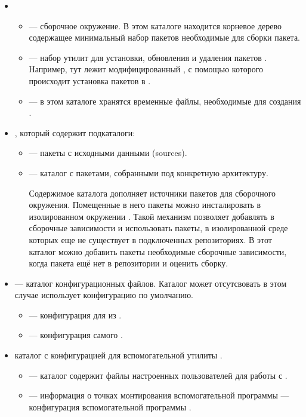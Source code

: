 \begin{itemize}
	\item {}
	\begin{itemize}
		\item {} --- сборочное окружение. В этом каталоге находится
			корневое дерево содержащее минимальный набор пакетов необходимые
			для сборки пакета.
		\item {} --- набор утилит для установки, обновления и удаления
			пакетов . Например, тут лежит модифицированный ,
			с помощью которого происходит установка пакетов в .
		\item {} --- в этом каталоге хранятся временные файлы, необходимые для
			создания .
	\end{itemize}
		\item {}, который содержит подкаталоги:
	\begin{itemize}
		\item {} --- пакеты с исходными данными (sources).
		\item {} --- каталог с пакетами, собранными
			под конкретную архитектуру.

			Содержимое каталога дополняет источники пакетов для сборочного окружения.
			Помещенные в него пакеты можно инсталировать в изолированном окружении .
			Такой механизм позволяет добавлять в сборочные зависимости и использовать пакеты, в
			изолированной среде которых еще не существует в подключенных репозиториях.
			В этот каталог можно добавить пакеты необходимые сборочные зависимости, когда
			пакета ещё нет в репозитории и оценить сборку.
	\end{itemize}
	\item {} --- каталог конфигурационных файлов. Каталог может отсутсвовать
	в этом случае  использует конфигурацию по умолчанию.
	\begin{itemize}
		\item {} --- конфигурация для  из .
		\item {} --- конфигурация самого .
	\end{itemize}
	\item {} каталог с конфигурацией для вспомогательной утилиты .
	\begin{itemize}
		\item {} --- каталог содержит файлы настроенных пользователей для работы с .
		\item {} --- информация о точках монтирования вспомогательной программы 
		 --- конфигурация вспомогательной программы .
	\end{itemize}
\end{itemize}

